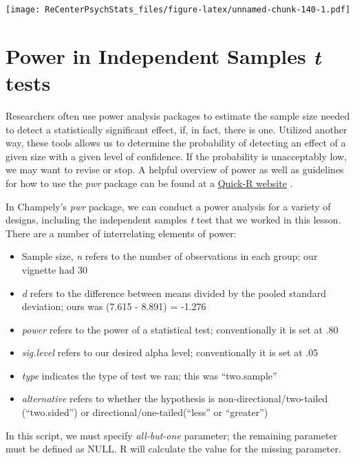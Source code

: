 \documentclass[
  11pt,
]{book}
\providecommand{\tightlist}{%
  \setlength{\itemsep}{0pt}\setlength{\parskip}{0pt}}
\begin{document}
\texttt{[image: ReCenterPsychStats\_files/figure-latex/unnamed-chunk-140-1.pdf]}

\hypertarget{power-in-independent-samples-t-tests-1}{%
\section{\texorpdfstring{Power in Independent Samples \emph{t} tests}{Power in Independent Samples t tests}}\label{power-in-independent-samples-t-tests-1}}

Researchers often use power analysis packages to estimate the sample size needed to detect a statistically significant effect, if, in fact, there is one. Utilized another way, these tools allows us to determine the probability of detecting an effect of a given size with a given level of confidence. If the probability is unacceptably low, we may want to revise or stop. A helpful overview of power as well as guidelines for how to use the \emph{pwr} package can be found at a \href{https://www.statmethods.net/stats/power.html}{Quick-R website} \citep{kabacoff_power_2017}.

In Champely's \emph{pwr} package, we can conduct a power analysis for a variety of designs, including the independent samples \emph{t} test that we worked in this lesson. There are a number of interrelating elements of power:

\begin{itemize}
\tightlist
\item
  Sample size, \emph{n} refers to the number of observations in each group; our vignette had 30
\item
  \emph{d} refers to the difference between means divided by the pooled standard deviation; ours was (7.615 - 8.891) = -1.276
\item
  \emph{power} refers to the power of a statistical test; conventionally it is set at .80
\item
  \emph{sig.level} refers to our desired alpha level; conventionally it is set at .05
\item
  \emph{type} indicates the type of test we ran; this was ``two.sample''
\item
  \emph{alternative} refers to whether the hypothesis is non-directional/two-tailed (``two.sided'') or directional/one-tailed(``less'' or ``greater'')
\end{itemize}

In this script, we must specify \emph{all-but-one} parameter; the remaining parameter must be defined as NULL. R will calculate the value for the missing parameter.
\end{document}
